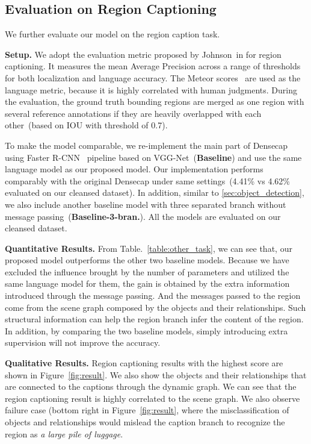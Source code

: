 \subsection{Evaluation on Region Captioning}
We further evaluate our model on the region caption task. 

\textbf{Setup.}  We adopt the evaluation metric proposed by Johnson~\etal in \cite{densecap} for region captioning. It measures the mean Average Precision across a range of thresholds for both localization and language accuracy. The Meteor scores~\cite{banerjee2005meteor} are used as the language metric, because it is highly correlated with human judgments. During the evaluation, the ground truth bounding regions are merged as one region with several reference annotations if they are heavily overlapped with each other~(based on IOU with threshold of 0.7).

To make the model comparable, we re-implement the main part of Densecap~\cite{densecap} using Faster R-CNN~\cite{faster_rcnn} pipeline based on VGG-Net~(\textbf{Baseline}) and use the same language model as our proposed model. Our implementation performs comparably with the original Densecap under same settings~(4.41\% vs 4.62\% evaluated on our cleansed dataset). In addition, similar to \ref{sec:object_detection}, we also include another baseline model with three separated branch without message passing~(\textbf{Baseline-3-bran.}).  All the models are evaluated on our cleansed dataset. 

\textbf{Quantitative Results.}  
From Table.~\ref{table:other_task}, we can see that, our proposed model outperforms the other two baseline models. Because we have excluded the influence brought by the number of parameters and utilized the same language model for them, the gain is obtained by the extra information introduced through the message passing. And the messages passed to the region come from the scene graph composed by the objects and their relationships. Such structural information can help the region branch infer the content of the region. In addition, by comparing the two baseline models, simply introducing extra supervision will not improve the accuracy.  


\textbf{Qualitative Results.} 
Region captioning results with the highest score are shown in Figure~\ref{fig:result}. We also show the objects and their relationships that are connected to the captions through the dynamic graph. We can see that the region captioning result is highly correlated to the scene graph. We also observe failure case (bottom right in Figure~\ref{fig:result}, where the misclassification of objects and relationships would mislead the caption branch to recognize the region as \emph{a large pile of luggage}. 




